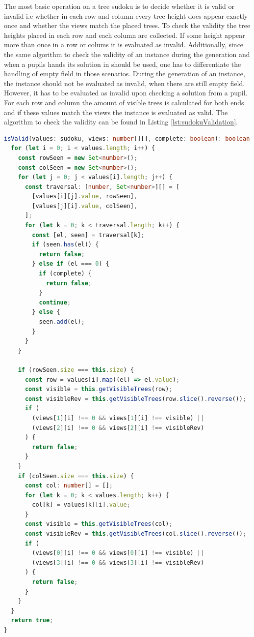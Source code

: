 The most basic operation on a tree sudoku is to decide whether it is valid or invalid i.e whether in each row and column every tree height does appear exactly once and whether the views match the placed trees.
To check the validity the tree heights placed in each row and each column are collected. If some height appear more than once in a row or colums it is evaluated as invalid. Additionally, since the same algorithm to check the validity of an instance during the generation and when a pupils hands its solution in should be used, one has to differentiate the handling of empty field in those scenarios. During the generation of an instance, the instance should not be evaluated as invalid, when there are still empty field. However, it has to be evaluated as invalid upon checking a solution from a pupil. 
For each row and column the amount of visible trees is calculated for both ends and if these values match the views the instance is evaluated as valid. The algorithm to check the validity can be found in Listing \ref{lst:sudokuValidation}.

\begin{lstlisting}[language=TypeScript,caption={Validation algorithm for a tree sudoku instance},label={lst:sudokuValidation}]
isValid(values: sudoku, views: number[][], complete: boolean): boolean {
  for (let i = 0; i < values.length; i++) {
    const rowSeen = new Set<number>();
    const colSeen = new Set<number>();
    for (let j = 0; j < values[i].length; j++) {
      const traversal: [number, Set<number>][] = [
        [values[i][j].value, rowSeen],
        [values[j][i].value, colSeen],
      ];
      for (let k = 0; k < traversal.length; k++) {
        const [el, seen] = traversal[k];
        if (seen.has(el)) {
          return false;
        } else if (el === 0) {
          if (complete) {
            return false;
          }
          continue;
        } else {
          seen.add(el);
        }
      }
    }

    if (rowSeen.size === this.size) {
      const row = values[i].map((el) => el.value);
      const visible = this.getVisibleTrees(row);
      const visibleRev = this.getVisibleTrees(row.slice().reverse());
      if (
        (views[1][i] !== 0 && views[1][i] !== visible) ||
        (views[2][i] !== 0 && views[2][i] !== visibleRev)
      ) {
        return false;
      }
    }
    if (colSeen.size === this.size) {
      const col: number[] = [];
      for (let k = 0; k < values.length; k++) {
        col[k] = values[k][i].value;
      }
      const visible = this.getVisibleTrees(col);
      const visibleRev = this.getVisibleTrees(col.slice().reverse());
      if (
        (views[0][i] !== 0 && views[0][i] !== visible) ||
        (views[3][i] !== 0 && views[3][i] !== visibleRev)
      ) {
        return false;
      }
    }
  }
  return true;
}
\end{lstlisting}

